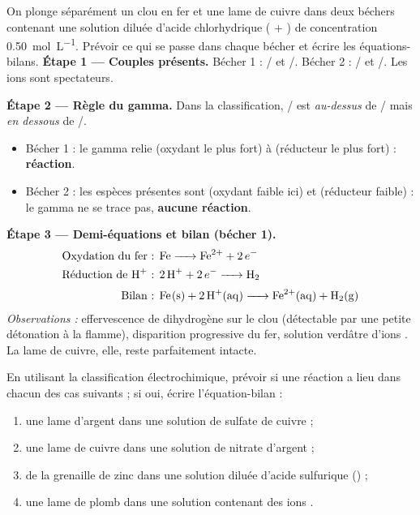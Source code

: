 \documentclass[11pt]{article}
\begin{document}
\begin{exoresolu}
On plonge séparément un clou en fer et une lame de cuivre dans deux béchers contenant une solution diluée d'acide chlorhydrique ( + ) de concentration \SI{0,50}{mol.L^{-1}}. Prévoir ce qui se passe dans chaque bécher et écrire les équations-bilans.
\tcblower
\textbf{Étape 1 — Couples présents.} Bécher 1 : / et /. Bécher 2 : / et /. Les ions  sont spectateurs.

\textbf{Étape 2 — Règle du gamma.} Dans la classification, / est \emph{au-dessus} de / mais \emph{en dessous} de /.
\begin{itemize}
\item Bécher 1 : le gamma relie  (oxydant le plus fort) à  (réducteur le plus fort) : \textbf{réaction}.
\item Bécher 2 : les espèces présentes sont  (oxydant faible ici) et  (réducteur faible) : le gamma ne se trace pas, \textbf{aucune réaction}.
\end{itemize}

\textbf{Étape 3 — Demi-équations et bilan (bécher 1).}
\begin{align*}
\text{Oxydation du fer : } & \ce{Fe} \ce{->} \ce{Fe^2+} + 2\,e^-\\
\text{Réduction de \ce{H+} : } & \ce{2 H+} + 2\,e^- \ce{->} \ce{H2}\\[2pt]
\text{Bilan : } & \ce{Fe(s) + 2 H+(aq) -> Fe^2+(aq) + H2(g)}
\end{align*}
\emph{Observations :} effervescence de dihydrogène sur le clou (détectable par une petite détonation à la flamme), disparition progressive du fer, solution verdâtre d'ions . La lame de cuivre, elle, reste parfaitement intacte.
\end{exoresolu}

\begin{exercice}
En utilisant la classification électrochimique, prévoir si une réaction a lieu dans chacun des cas suivants ; si oui, écrire l'équation-bilan :
\begin{enumerate}
\item une lame d'argent dans une solution de sulfate de cuivre  ;
\item une lame de cuivre dans une solution de nitrate d'argent  ;
\item de la grenaille de zinc dans une solution diluée d'acide sulfurique () ;
\item une lame de plomb dans une solution contenant des ions .
\end{enumerate}
\end{exercice}
\end{document}
